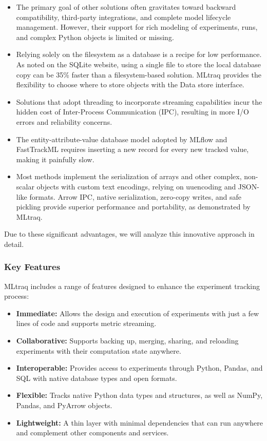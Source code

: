 \begin{itemize}
    \item The primary goal of other solutions often gravitates toward backward compatibility, third-party integrations, and complete model lifecycle management. However, their support for rich modeling of experiments, runs, and complex Python objects is limited or missing.
    \item Relying solely on the filesystem as a database is a recipe for low performance. As noted on the SQLite website, using a single file to store the local database copy can be 35\% faster than a filesystem-based solution. MLtraq provides the flexibility to choose where to store objects with the Data store interface.
    \item Solutions that adopt threading to incorporate streaming capabilities incur the hidden cost of Inter-Process Communication (IPC), resulting in more I/O errors and reliability concerns.
    \item The entity-attribute-value database model adopted by MLflow and FastTrackML requires inserting a new record for every new tracked value, making it painfully slow.
    \item Most methods implement the serialization of arrays and other complex, non-scalar objects with custom text encodings, relying on uuencoding and JSON-like formats. Arrow IPC, native serialization, zero-copy writes, and safe pickling provide superior performance and portability, as demonstrated by MLtraq.
\end{itemize}

Due to these significant advantages, we will analyze this innovative approach in detail.

\subsubsection{Key Features}

MLtraq includes a range of features designed to enhance the experiment tracking process:

\begin{itemize}
    \item \textbf{Immediate:} Allows the design and execution of experiments with just a few lines of code and supports metric streaming.
    \item \textbf{Collaborative:} Supports backing up, merging, sharing, and reloading experiments with their computation state anywhere.
    \item \textbf{Interoperable:} Provides access to experiments through Python, Pandas, and SQL with native database types and open formats.
    \item \textbf{Flexible:} Tracks native Python data types and structures, as well as NumPy, Pandas, and PyArrow objects.
    \item \textbf{Lightweight:} A thin layer with minimal dependencies that can run anywhere and complement other components and services.
\end{itemize}

